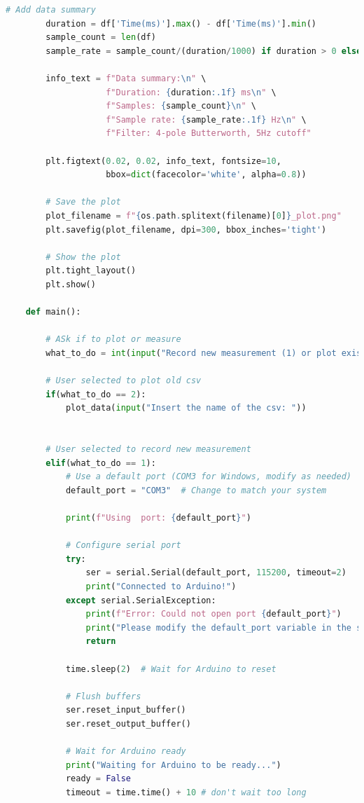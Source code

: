 \begin{lstlisting}[style=pythonstyle, caption=Python Serial Receive Script, label=lst:pythonCodeApp, language=Python ]
        # Add data summary
        duration = df['Time(ms)'].max() - df['Time(ms)'].min()
        sample_count = len(df)
        sample_rate = sample_count/(duration/1000) if duration > 0 else 0
        
        info_text = f"Data summary:\n" \
                    f"Duration: {duration:.1f} ms\n" \
                    f"Samples: {sample_count}\n" \
                    f"Sample rate: {sample_rate:.1f} Hz\n" \
                    f"Filter: 4-pole Butterworth, 5Hz cutoff"
                    
        plt.figtext(0.02, 0.02, info_text, fontsize=10, 
                    bbox=dict(facecolor='white', alpha=0.8))
        
        # Save the plot
        plot_filename = f"{os.path.splitext(filename)[0]}_plot.png"
        plt.savefig(plot_filename, dpi=300, bbox_inches='tight')
        
        # Show the plot
        plt.tight_layout()
        plt.show()
    
    def main():
    
        # ASk if to plot or measure
        what_to_do = int(input("Record new measurement (1) or plot existing (2): "))
    
        # User selected to plot old csv
        if(what_to_do == 2):
            plot_data(input("Insert the name of the csv: "))
        
    
        # User selected to record new measurement
        elif(what_to_do == 1):
            # Use a default port (COM3 for Windows, modify as needed)
            default_port = "COM3"  # Change to match your system
            
            print(f"Using  port: {default_port}")
            
            # Configure serial port
            try:
                ser = serial.Serial(default_port, 115200, timeout=2)
                print("Connected to Arduino!")
            except serial.SerialException:
                print(f"Error: Could not open port {default_port}")
                print("Please modify the default_port variable in the script.")
                return
            
            time.sleep(2)  # Wait for Arduino to reset
            
            # Flush buffers
            ser.reset_input_buffer()
            ser.reset_output_buffer()
            
            # Wait for Arduino ready
            print("Waiting for Arduino to be ready...")
            ready = False
            timeout = time.time() + 10 # don't wait too long
            

\end{lstlisting}
